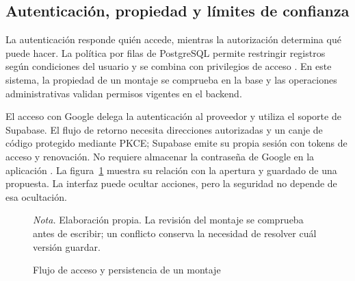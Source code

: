 \documentclass[12pt,letterpaper]{article}
\newcommand{\nota}[1]{\par{\normalfont\normalsize\doublespacing\raggedright\setlength{\parindent}{0pt}\noindent\textit{Nota.} #1\par}}
\begin{document}
\subsection{Autenticación, propiedad y límites de confianza}
La autenticación responde quién accede, mientras la autorización determina qué puede hacer. La política por filas de PostgreSQL permite restringir registros según condiciones del usuario y se combina con privilegios de acceso \citep{postgres,rls}. En este sistema, la propiedad de un montaje se comprueba en la base y las operaciones administrativas validan permisos vigentes en el backend.

El acceso con Google delega la autenticación al proveedor y utiliza el soporte de Supabase. El flujo de retorno necesita direcciones autorizadas y un canje de código protegido mediante PKCE; Supabase emite su propia sesión con tokens de acceso y renovación. No requiere almacenar la contraseña de Google en la aplicación \citep{oauth}. La figura~\ref{fig:flujo} muestra su relación con la apertura y guardado de una propuesta. La interfaz puede ocultar acciones, pero la seguridad no depende de esa ocultación.

\begin{figure}[H]
\caption{Flujo de acceso y persistencia de un montaje}\label{fig:flujo}
\centering


\nota{Elaboración propia. La revisión del montaje se comprueba antes de escribir; un conflicto conserva la necesidad de resolver cuál versión guardar.}
\end{figure}
\end{document}
